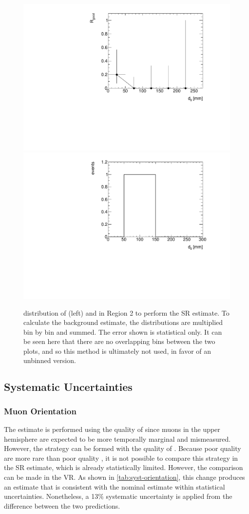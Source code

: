\begin{figure}[htbp]
\centering
\includegraphics[width=.48\textwidth]{figures/cosmics/d0_SR_v4_rgood.pdf}
\includegraphics[width=.48\textwidth]{figures/cosmics/d0_SR_v4_2mu.pdf}
\caption{\absdz distribution of \rgood (left) and \mt in Region 2 to perform the SR estimate. To calculate the background estimate, the distributions are multiplied bin by bin and summed. The error shown is statistical only. It can be seen here that there are no overlapping bins between the two plots, and so this method is ultimately not used, in favor of an unbinned version.}
\label{fig:SR-rgood}
\end{figure}

\subsection{\label{sec:cos_syst}Systematic Uncertainties}

\subsubsection{Muon Orientation}

The estimate is performed using the quality of \mt since muons in the upper hemisphere are expected to be more temporally marginal and mismeasured. However, the strategy can be formed with the quality of \mb. Because poor quality \mb are more rare than poor quality \mt, it is not possible to compare this strategy in the SR estimate, which is already statistically limited. However, the comparison can be made in the VR. As shown in \autoref{tab:syst-orientation}, this change produces an estimate that is consistent with the nominal estimate within statistical uncertainties. Nonetheless, a 13\% systematic uncertainty is applied from the difference between the two predictions.

